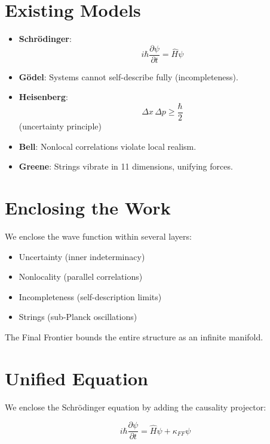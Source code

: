 \section{Existing Models}

\begin{itemize}
    \item \textbf{Schrödinger}: 
    \[
    i \hbar \frac{\partial \psi}{\partial t} = \hat{H} \psi
    \]
    
    \item \textbf{Gödel}: Systems cannot self-describe fully (incompleteness).
    
    \item \textbf{Heisenberg}: 
    \[
    \Delta x \, \Delta p \geq \frac{\hbar}{2}
    \]
    (uncertainty principle)
    
    \item \textbf{Bell}: Nonlocal correlations violate local realism.
    
    \item \textbf{Greene}: Strings vibrate in 11 dimensions, unifying forces.
\end{itemize}

\section{Enclosing the Work}

We enclose the wave function within several layers:

\begin{itemize}
    \item Uncertainty (inner indeterminacy)
    \item Nonlocality (parallel correlations)
    \item Incompleteness (self-description limits)
    \item Strings (sub-Planck oscillations)
\end{itemize}

The Final Frontier bounds the entire structure as an infinite manifold.

\section{Unified Equation}

We enclose the Schrödinger equation by adding the causality projector:

\begin{equation}
i \hbar \frac{\partial \psi}{\partial t} = \hat{H} \psi + \kappa_{FF} \psi
\end{equation}

